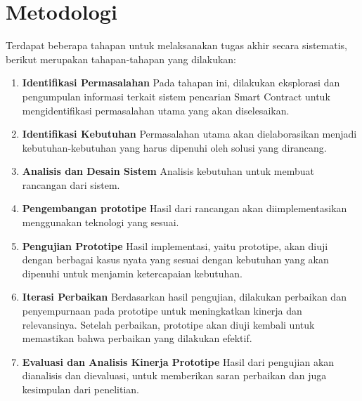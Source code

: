 \section{Metodologi}
\label{sec:metodologi}


Terdapat beberapa tahapan untuk melaksanakan tugas akhir secara sistematis, berikut merupakan tahapan-tahapan yang dilakukan:

\begin{enumerate}
	\item \textbf{Identifikasi Permasalahan} \newline
	      Pada tahapan ini, dilakukan eksplorasi dan pengumpulan informasi terkait sistem pencarian Smart Contract untuk mengidentifikasi permasalahan utama yang akan diselesaikan.
	\item \textbf{Identifikasi Kebutuhan} \newline
	      Permasalahan utama akan dielaborasikan menjadi kebutuhan-kebutuhan yang harus dipenuhi oleh solusi yang dirancang.
	\item \textbf{Analisis dan Desain Sistem} \newline
	      Analisis kebutuhan untuk membuat rancangan dari sistem.
	\item \textbf{Pengembangan prototipe} \newline
	      Hasil dari rancangan akan diimplementasikan menggunakan teknologi yang sesuai.
	\item \textbf{Pengujian Prototipe} \newline
	      Hasil implementasi, yaitu prototipe, akan diuji dengan berbagai kasus nyata yang sesuai dengan kebutuhan yang akan dipenuhi untuk menjamin ketercapaian kebutuhan.
	\item \textbf{Iterasi Perbaikan} \newline
	      Berdasarkan hasil pengujian, dilakukan perbaikan dan penyempurnaan pada prototipe untuk meningkatkan kinerja dan relevansinya. Setelah perbaikan, prototipe akan diuji kembali untuk memastikan bahwa perbaikan yang dilakukan efektif.
	\item \textbf{Evaluasi dan Analisis Kinerja Prototipe} \newline
	      Hasil dari pengujian akan dianalisis dan dievaluasi, untuk memberikan saran perbaikan dan juga kesimpulan dari penelitian.
\end{enumerate}

